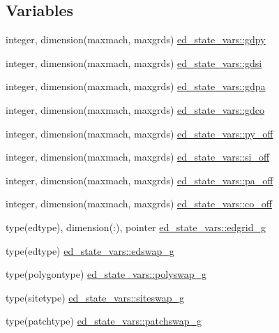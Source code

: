 \subsection*{Variables}
\begin{DoxyCompactItemize}
\item 
integer, dimension(maxmach, maxgrds) \hyperlink{namespaceed__state__vars_aac712f975ee36c66ad91c4b4687cdf71}{ed\+\_\+state\+\_\+vars\+::gdpy}
\item 
integer, dimension(maxmach, maxgrds) \hyperlink{namespaceed__state__vars_a77208cdb17b6a08bcdd07c476d5c6139}{ed\+\_\+state\+\_\+vars\+::gdsi}
\item 
integer, dimension(maxmach, maxgrds) \hyperlink{namespaceed__state__vars_ad2a53bb636997523d8bdacfaa6f1b9b9}{ed\+\_\+state\+\_\+vars\+::gdpa}
\item 
integer, dimension(maxmach, maxgrds) \hyperlink{namespaceed__state__vars_a4fc7c00baa15ee35e1703f12faa7fae2}{ed\+\_\+state\+\_\+vars\+::gdco}
\item 
integer, dimension(maxmach, maxgrds) \hyperlink{namespaceed__state__vars_a7ebd94319455148e1487107c339113ca}{ed\+\_\+state\+\_\+vars\+::py\+\_\+off}
\item 
integer, dimension(maxmach, maxgrds) \hyperlink{namespaceed__state__vars_a40e5ef082020264b3ac022cbf41351e1}{ed\+\_\+state\+\_\+vars\+::si\+\_\+off}
\item 
integer, dimension(maxmach, maxgrds) \hyperlink{namespaceed__state__vars_a5d1fee7506efe5c3d326478d44f97e42}{ed\+\_\+state\+\_\+vars\+::pa\+\_\+off}
\item 
integer, dimension(maxmach, maxgrds) \hyperlink{namespaceed__state__vars_abb0498b9e5f1a7195d6260a97973b89f}{ed\+\_\+state\+\_\+vars\+::co\+\_\+off}
\item 
type(edtype), dimension(\+:), pointer \hyperlink{namespaceed__state__vars_a1ad47f9c446f02cad8b7a7a2bce06c8a}{ed\+\_\+state\+\_\+vars\+::edgrid\+\_\+g}
\item 
type(edtype) \hyperlink{namespaceed__state__vars_a42ec67e3b97c2e4abb244b7ec1e7f4c2}{ed\+\_\+state\+\_\+vars\+::edswap\+\_\+g}
\item 
type(polygontype) \hyperlink{namespaceed__state__vars_ae193a761d3f04f8bb0bf11c6e624f7b7}{ed\+\_\+state\+\_\+vars\+::polyswap\+\_\+g}
\item 
type(sitetype) \hyperlink{namespaceed__state__vars_ae55643d7022454835dc2a4b11c4a2b04}{ed\+\_\+state\+\_\+vars\+::siteswap\+\_\+g}
\item 
type(patchtype) \hyperlink{namespaceed__state__vars_ad11390031b4401ce635598920fc0523a}{ed\+\_\+state\+\_\+vars\+::patchswap\+\_\+g}

\end{DoxyCompactItemize}
